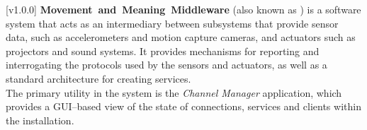 [v1.0.0]
\textbf{Movement~and~Meaning~Middleware} (also known as \mplusm{}) is a software system
that acts as an intermediary between subsystems that provide sensor data, such as
accelerometers and motion capture cameras, and actuators such as projectors and sound
systems.
It provides mechanisms for reporting and interrogating the protocols used by the sensors
and actuators, as well as a standard architecture for creating services.\\

The primary utility in the \mplusm{} system is the \emph{Channel Manager} application,
which provides a GUI--based view of the state of connections, services and clients within
the installation.
\primaryEnd{}
